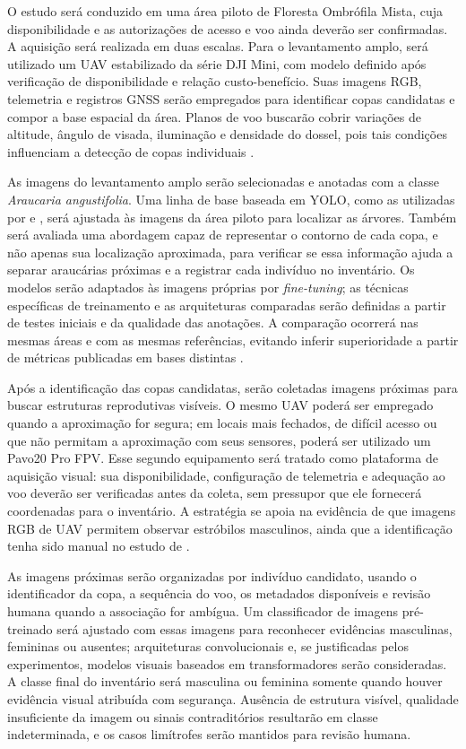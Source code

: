O estudo será conduzido em uma área piloto de Floresta Ombrófila Mista, cuja disponibilidade e as autorizações de acesso e voo ainda deverão ser confirmadas. A aquisição será realizada em duas escalas. Para o levantamento amplo, será utilizado um UAV estabilizado da série DJI Mini, com modelo definido após verificação de disponibilidade e relação custo-benefício. Suas imagens RGB, telemetria e registros GNSS serão empregados para identificar copas candidatas e compor a base espacial da área. Planos de voo buscarão cobrir variações de altitude, ângulo de visada, iluminação e densidade do dossel, pois tais condições influenciam a detecção de copas individuais \citep{zhao2023}.

As imagens do levantamento amplo serão selecionadas e anotadas com a classe \textit{Araucaria angustifolia}. Uma linha de base baseada em YOLO, como as utilizadas por \citet{correa2024} e \citet{karasinski2025}, será ajustada às imagens da área piloto para localizar as árvores. Também será avaliada uma abordagem capaz de representar o contorno de cada copa, e não apenas sua localização aproximada, para verificar se essa informação ajuda a separar araucárias próximas e a registrar cada indivíduo no inventário. Os modelos serão adaptados às imagens próprias por \textit{fine-tuning}; as técnicas específicas de treinamento e as arquiteturas comparadas serão definidas a partir de testes iniciais e da qualidade das anotações. A comparação ocorrerá nas mesmas áreas e com as mesmas referências, evitando inferir superioridade a partir de métricas publicadas em bases distintas \citep{zhao2023}.

Após a identificação das copas candidatas, serão coletadas imagens próximas para buscar estruturas reprodutivas visíveis. O mesmo UAV poderá ser empregado quando a aproximação for segura; em locais mais fechados, de difícil acesso ou que não permitam a aproximação com seus sensores, poderá ser utilizado um Pavo20 Pro FPV. Esse segundo equipamento será tratado como plataforma de aquisição visual: sua disponibilidade, configuração de telemetria e adequação ao voo deverão ser verificadas antes da coleta, sem pressupor que ele fornecerá coordenadas para o inventário. A estratégia se apoia na evidência de que imagens RGB de UAV permitem observar estróbilos masculinos, ainda que a identificação tenha sido manual no estudo de \citet{demetrio2022}.

As imagens próximas serão organizadas por indivíduo candidato, usando o identificador da copa, a sequência do voo, os metadados disponíveis e revisão humana quando a associação for ambígua. Um classificador de imagens pré-treinado será ajustado com essas imagens para reconhecer evidências masculinas, femininas ou ausentes; arquiteturas convolucionais e, se justificadas pelos experimentos, modelos visuais baseados em transformadores serão consideradas. A classe final do inventário será masculina ou feminina somente quando houver evidência visual atribuída com segurança. Ausência de estrutura visível, qualidade insuficiente da imagem ou sinais contraditórios resultarão em classe indeterminada, e os casos limítrofes serão mantidos para revisão humana.

